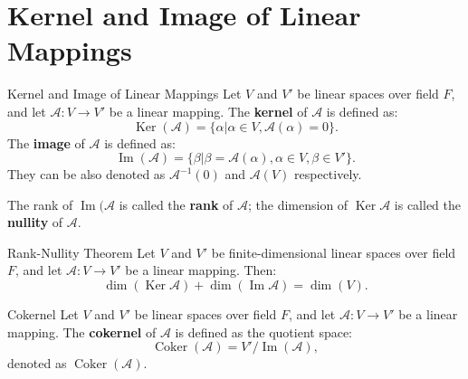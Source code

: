 \documentclass[11pt]{../../TexTemplate/elegantbook} %
\begin{document}
\section{Kernel and Image of Linear Mappings}
\begin{definition}{Kernel and Image of Linear Mappings}
    Let \( V \) and \( V' \) be linear spaces over field \( F \), 
    and let \( \mathcal{A}: V \to V' \) be a linear mapping. 
    The \textbf{kernel} of \( \mathcal{A} \) is defined as:
    \[
    \operatorname{Ker}(\mathcal{A}) = \{ \alpha | \alpha \in V, \mathcal{A}(\alpha) = 0 \}.
    \]
    The \textbf{image} of \( \mathcal{A} \) is defined as:
    \[
    \operatorname{Im}(\mathcal{A}) = \{ \beta | \beta = \mathcal{A}(\alpha), 
    \alpha \in V, \beta \in V' \}.
    \]
    They can be also denoted as \( \mathcal{A}^{-1}(0) \) and \( \mathcal{A}(V) \) respectively.

    The rank of \( \operatorname{Im}(\mathcal{A} \) is called the \textbf{rank} of \( \mathcal{A} \);
    the dimension of \( \operatorname{Ker}\mathcal{A} \) is called the \textbf{nullity} of \( \mathcal{A} \).
\end{definition}

\begin{property}
    
\end{property}


\begin{theorem}{Rank-Nullity Theorem}
    Let \( V \) and \( V' \) be finite-dimensional linear spaces over field \( F \), 
    and let \( \mathcal{A}: V \to V' \) be a linear mapping. Then:
    \[
    \dim(\operatorname{Ker}\mathcal{A}) + \dim(\operatorname{Im}\mathcal{A}) = \dim(V).
    \]
\end{theorem}


\begin{definition}{Cokernel}
    Let \( V \) and \( V' \) be linear spaces over field \( F \), 
    and let \( \mathcal{A}: V \to V' \) be a linear mapping. 
    The \textbf{cokernel} of \( \mathcal{A} \) is defined as the quotient space:
    \[
    \operatorname{Coker}(\mathcal{A}) = V' / \operatorname{Im}(\mathcal{A}),
    \]
    denoted as \( \operatorname{Coker}(\mathcal{A}) \).
\end{definition}
\end{document}
